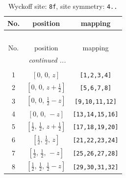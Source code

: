 \documentclass[fleqn,8pt]{jsarticle}
\begin{document}
\begin{longtable}{ccc}
\caption{Wyckoff site: {\tt 8f}, site symmetry: {\tt 4..}}
 \\
 \hline \hline
No. & position & mapping \\ \hline \endfirsthead

\multicolumn{2}{l}{\tablename\ \thetable{}} \\
 \hline \hline
No. & position & mapping \\ \hline \endhead

 \hline \hline
\multicolumn{2}{r}{\footnotesize\it continued ...} \\ \endfoot

 \hline \hline
\multicolumn{2}{r}{} \\ \endlastfoot

1 & $\left[ 0,\, 0,\, z \right]$ & {\tt [1,2,3,4]} \\ \hline
2 & $\left[ 0,\, 0,\, z + \frac{1}{2} \right]$ & {\tt [5,6,7,8]} \\ \hline
3 & $\left[ 0,\, 0,\, \frac{1}{2} - z \right]$ & {\tt [9,10,11,12]} \\ \hline
4 & $\left[ 0,\, 0,\, - z \right]$ & {\tt [13,14,15,16]} \\ \hline
5 & $\left[ \frac{1}{2},\, \frac{1}{2},\, z + \frac{1}{2} \right]$ & {\tt [17,18,19,20]} \\ \hline
6 & $\left[ \frac{1}{2},\, \frac{1}{2},\, z \right]$ & {\tt [21,22,23,24]} \\ \hline
7 & $\left[ \frac{1}{2},\, \frac{1}{2},\, - z \right]$ & {\tt [25,26,27,28]} \\ \hline
8 & $\left[ \frac{1}{2},\, \frac{1}{2},\, \frac{1}{2} - z \right]$ & {\tt [29,30,31,32]} \\
\end{longtable}
\renewcommand{\arraystretch}{1.2}
\end{document}
